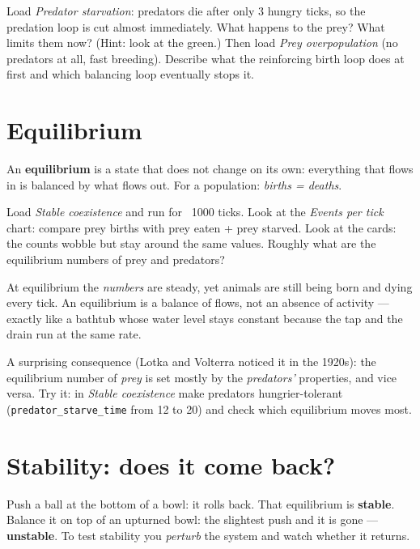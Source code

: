 \documentclass[11pt,a4paper]{article}
\newcommand{\param}[1]{\texttt{\small #1}}
\begin{document}
\begin{tryit}
Load \emph{Predator starvation}: predators die after only 3 hungry ticks, so the predation loop is cut almost
immediately. What happens to the prey? What limits them now? (Hint: look at the green.)
Then load \emph{Prey overpopulation} (no predators at all, fast breeding). Describe what the reinforcing birth
loop does at first and which balancing loop eventually stops it.
\end{tryit}

\section{Equilibrium}
\begin{idea}[: equilibrium]
An \textbf{equilibrium} is a state that does not change on its own: everything that flows in is balanced by
what flows out. For a population: \emph{births = deaths}.
\end{idea}

\begin{tryit}
Load \emph{Stable coexistence} and run for ~1000 ticks. Look at the \emph{Events per tick} chart:
compare prey births with prey eaten + prey starved. Look at the cards: the counts wobble but stay around the
same values. Roughly what are the equilibrium numbers of prey and predators?
\end{tryit}

\begin{think}
At equilibrium the \emph{numbers} are steady, yet animals are still being born and dying every tick.
An equilibrium is a balance of flows, not an absence of activity --- exactly like a bathtub whose water level
stays constant because the tap and the drain run at the same rate.
\end{think}

A surprising consequence (Lotka and Volterra noticed it in the 1920s): the equilibrium number of
\emph{prey} is set mostly by the \emph{predators'} properties, and vice versa. Try it: in
\emph{Stable coexistence} make predators hungrier-tolerant (\param{predator\_starve\_time} from 12 to 20)
and check which equilibrium moves most.

\section{Stability: does it come back?}
\begin{idea}[: stability]
Push a ball at the bottom of a bowl: it rolls back. That equilibrium is \textbf{stable}. Balance it on top of
an upturned bowl: the slightest push and it is gone --- \textbf{unstable}. To test stability you
\emph{perturb} the system and watch whether it returns.
\end{idea}
\end{document}
